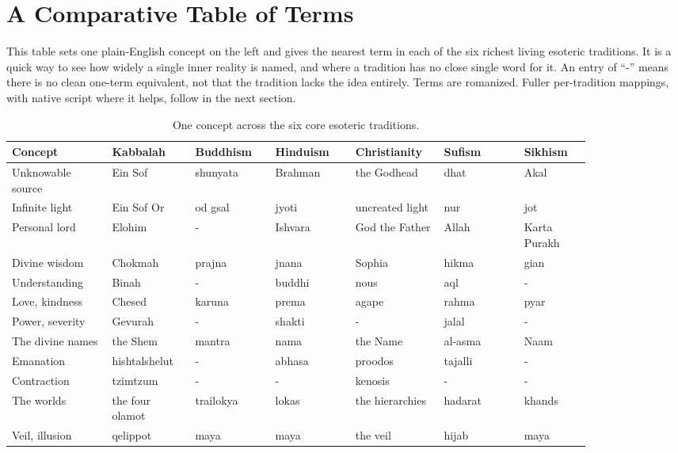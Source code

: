 \section{A Comparative Table of Terms}

This table sets one plain-English concept on the left and gives the nearest term in each of the six richest
living esoteric traditions. It is a quick way to see how widely a single inner reality is named, and where a
tradition has no close single word for it. An entry of \enquote{-} means there is no clean one-term
equivalent, not that the tradition lacks the idea entirely. Terms are romanized. Fuller per-tradition
mappings, with native script where it helps, follow in the next section.

{\footnotesize
\begin{longtable}{L{0.15\linewidth} L{0.12\linewidth} L{0.12\linewidth} L{0.12\linewidth} L{0.12\linewidth} L{0.12\linewidth} L{0.10\linewidth}}
\caption{One concept across the six core esoteric traditions.}\\
\toprule
\textbf{Concept} & \textbf{Kabbalah} & \textbf{Buddhism} & \textbf{Hinduism} & \textbf{Christianity} & \textbf{Sufism} & \textbf{Sikhism} \\
\midrule
\endhead
Unknowable source & Ein Sof & shunyata & Brahman & the Godhead & dhat & Akal \\
Infinite light & Ein Sof Or & od gsal & jyoti & uncreated light & nur & jot \\
Personal lord & Elohim & - & Ishvara & God the Father & Allah & Karta Purakh \\
Divine wisdom & Chokmah & prajna & jnana & Sophia & hikma & gian \\
Understanding & Binah & - & buddhi & nous & aql & - \\
Love, kindness & Chesed & karuna & prema & agape & rahma & pyar \\
Power, severity & Gevurah & - & shakti & - & jalal & - \\
The divine names & the Shem & mantra & nama & the Name & al-asma & Naam \\
Emanation & hishtalshelut & - & abhasa & proodos & tajalli & - \\
Contraction & tzimtzum & - & - & kenosis & - & - \\
The worlds & the four olamot & trailokya & lokas & the hierarchies & hadarat & khands \\
Veil, illusion & qelippot & maya & maya & the veil & hijab & maya \\

\end{longtable}}
